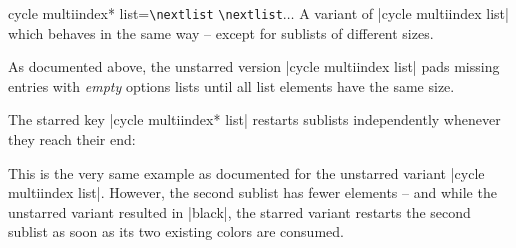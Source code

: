 \begin{pgfplotskey}{%
    cycle multiindex* list=\texttt{\textbackslash nextlist}%
    \texttt{\textbackslash nextlist}$\ldots$
}
    A variant of |cycle multiindex list| which behaves in the same way --
    except for sublists of different sizes.

    As documented above, the unstarred version |cycle multiindex list| pads
    missing entries with \emph{empty} options lists until all list elements
    have the same size.

    The starred key |cycle multiindex* list| restarts sublists independently
    whenever they reach their end:
\begin{codeexample}[]
\end{codeexample}
    This is the very same example as documented for the unstarred variant
    |cycle multiindex list|. However, the second sublist has fewer elements --
    and while the unstarred variant resulted in |black|, the starred variant
    restarts the second sublist as soon as its two existing colors are
    consumed.


\end{pgfplotskey}
